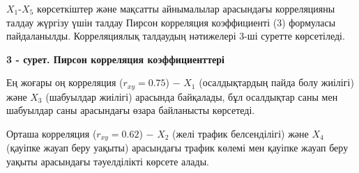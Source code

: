 % 

\(X_{1}\)-\(X_{5}\) көрсеткіштер және мақсатты айнымалылар арасындағы
корреляцияны талдау жүргізу үшін талдау Пирсон корреляция коэффициенті
(3) формуласы пайдаланылды. Корреляциялық талдаудың нәтижелері 3-ші
суретте көрсетіледі.

{\bfseries 3 - сурет. Пирсон корреляция коэффициенттері}

Ең жоғары оң корреляция (\(r_{xy} = 0.75\)) − \(X_{1}\) (осалдықтардың
пайда болу жиілігі) және \(X_{3}\) (шабуылдар жиілігі) арасында
байқалады, бұл осалдықтар саны мен шабуылдар саны арасындағы өзара
байланысты көрсетеді.

Орташа корреляция (\(r_{xy} = 0.62\)) − \(X_{2}\) (желі трафик
белсенділігі) және \(X_{4}\) (қауіпке жауап беру уақыты) арасындағы
трафик көлемі мен қауіпке жауап беру уақыты арасындағы тәуелділікті
көрсете алады.

